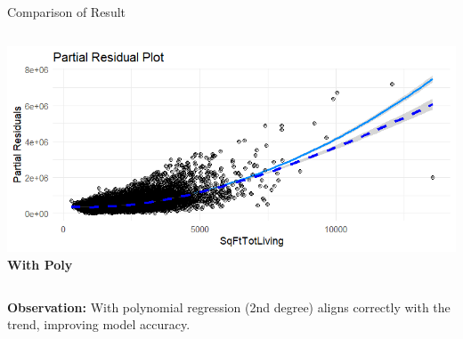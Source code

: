 \documentclass{beamer}
\begin{document}
	
\begin{frame}{Comparison of Result}
	\begin{columns}
	
		\centering
		\includegraphics[width=\linewidth]{with_poly.png}
		\textbf{With Poly}
	\end{columns}
	
	\vspace{1em}
    \textbf{Observation:} With polynomial regression (2nd degree) aligns correctly with the trend, improving model accuracy.
\end{frame}
\end{document}
